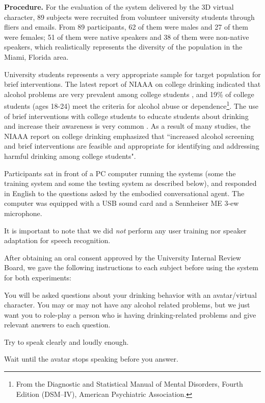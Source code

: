 \documentclass[letterpaper]{article}
\begin{document}
{\bf Procedure.}  For the evaluation of the system delivered by the 3D virtual character, 89 subjects were recruited from volunteer university students through fliers and emails.  From 89 participants, 62 of them were males and 27 of them were females; 51 of them were native speakers and 38 of them were non-native speakers,   which realistically represents the diversity of the population in the Miami, Florida area.

University students represents a very appropriate sample for target population for brief interventions. The latest report of NIAAA on college drinking indicated that alcohol problems are very prevalent among college students \cite{NIAAA2007colleges}, and 19\% of college students (ages 18-24) meet the criteria for alcohol abuse or dependence\footnote{From the Diagnostic and Statistical Manual of Mental Disorders, Fourth Edition (DSM–IV), American Psychiatric Association.}. The use of brief interventions with college students to educate students about drinking and  increase their awareness is very common \cite{NIAAA2007colleges}. As a result of many studies, the NIAAA report on college drinking emphasized that ``increased alcohol screening and brief interventions are feasible  and appropriate for identifying and addressing harmful drinking among college students". 

Participants sat in front of a PC computer running the systems (some the training system and some the testing system as described below), and responded in English to the questions asked by the embodied conversational agent.  The computer was equipped with a USB sound card and a Sennheiser ME 3-ew microphone.

It is important to note that we did {\em not} perform any user training nor speaker adaptation for speech recognition. 

After obtaining an oral consent approved by the University Internal Review Board, we gave the following instructions to each subject before using the system for both experiments:
\begin{compactitem}
\item You will be asked questions about your drinking behavior with an avatar/virtual character.  You may or may not have any alcohol related problems, but we just want you to role-play a person who is having drinking-related problems and give relevant answers to each question.
\item Try to speak clearly and loudly enough.
\item Wait until the avatar stops speaking before you answer.
\end{compactitem} 
\end{document}
